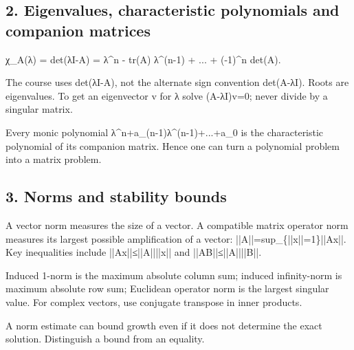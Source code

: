 \documentclass[11pt,a4paper]{article}
\begin{document}
\subsection{2. Eigenvalues, characteristic polynomials and companion matrices}
\begin{equationbox}\raggedright
{\ttfamily\small χ\_A(λ) = det(λI-A) = λ\textasciicircum{}n - tr(A) λ\textasciicircum{}(n-1) + ... + (-1)\textasciicircum{}n det(A).}\par
\end{equationbox}
\begin{conceptbox}The course uses det(λI-A), not the alternate sign convention det(A-λI). Roots are eigenvalues. To get an eigenvector v for λ solve (A-λI)v=0; never divide by a singular matrix.\end{conceptbox}
\begin{conceptbox}Every monic polynomial λ\textasciicircum{}n+a\_(n-1)λ\textasciicircum{}(n-1)+...+a\_0 is the characteristic polynomial of its companion matrix. Hence one can turn a polynomial problem into a matrix problem.\end{conceptbox}

\subsection{3. Norms and stability bounds}
\begin{conceptbox}A vector norm measures the size of a vector. A compatible matrix operator norm measures its largest possible amplification of a vector: ||A||=sup\_\{||x||=1\}||Ax||. Key inequalities include ||Ax||≤||A||||x|| and ||AB||≤||A||||B||.\end{conceptbox}
\begin{conceptbox}Induced 1-norm is the maximum absolute column sum; induced infinity-norm is maximum absolute row sum; Euclidean operator norm is the largest singular value. For complex vectors, use conjugate transpose in inner products.\end{conceptbox}
\begin{conceptbox}A norm estimate can bound growth even if it does not determine the exact solution. Distinguish a bound from an equality.\end{conceptbox}
\end{document}
